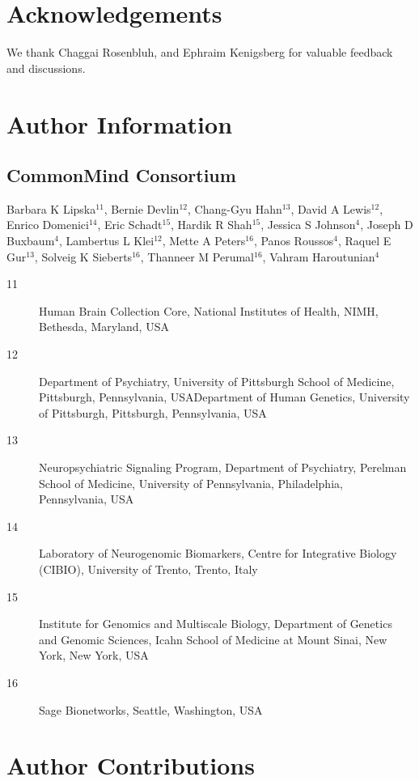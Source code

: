 \documentclass[letterpaper]{article}
\begin{document}
\section*{Acknowledgements}

We thank Chaggai Rosenbluh, and Ephraim Kenigsberg for valuable feedback and discussions.

\section*{Author Information}

\subsection*{CommonMind Consortium}

Barbara K Lipska\(^{11}\), Bernie Devlin\(^{12}\), Chang-Gyu Hahn\(^{13}\), David A Lewis\(^{12}\), Enrico
Domenici\(^{14}\), Eric Schadt\(^{15}\), Hardik R Shah\(^{15}\), Jessica S
Johnson\(^{4}\), Joseph D Buxbaum\(^{4}\),
Lambertus L Klei\(^{12}\), Mette A Peters\(^{16}\), Panos Roussos\(^{4}\),
Raquel E Gur\(^{13}\), Solveig K
Sieberts\(^{16}\), Thanneer M Perumal\(^{16}\), Vahram Haroutunian\(^{4}\)

\begin{description}
\item[11] Human Brain Collection Core, National Institutes of Health, NIMH, Bethesda, Maryland, USA
\item[12] Department of Psychiatry, University of Pittsburgh School of
Medicine, Pittsburgh, Pennsylvania, USADepartment of Human Genetics,
University of Pittsburgh, Pittsburgh, Pennsylvania, USA
\item[13] Neuropsychiatric Signaling Program, Department of Psychiatry,
Perelman School of Medicine, University of Pennsylvania, Philadelphia,
Pennsylvania, USA
\item[14] Laboratory of Neurogenomic Biomarkers, Centre  for Integrative
Biology (CIBIO), University of Trento, Trento, Italy
\item[15] Institute for Genomics and Multiscale Biology, Department of
Genetics and Genomic Sciences, Icahn School of Medicine at Mount Sinai, New
York, New York, USA
\item[16] Sage Bionetworks, Seattle, Washington, USA

\end{description}

\section*{Author Contributions}
\end{document}
